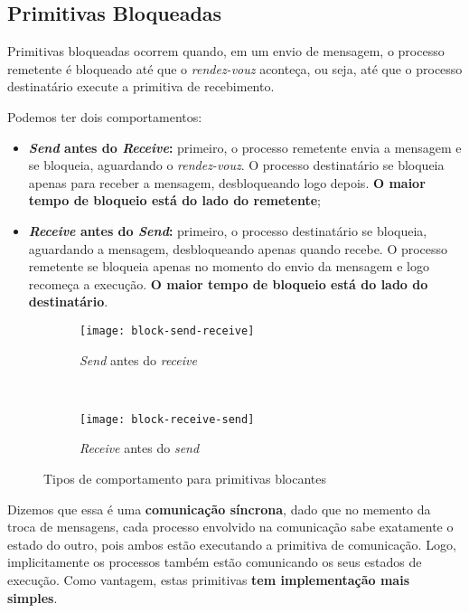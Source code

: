 \subsection{Primitivas Bloqueadas}
Primitivas bloqueadas ocorrem quando, em um envio de mensagem, o processo remetente é bloqueado até que o \textit{rendez-vouz} aconteça, ou seja, até que o processo destinatário execute a primitiva de recebimento.

Podemos ter dois comportamentos:
\begin{itemize}
  \item \textbf{\textit{Send} antes do \textit{Receive}:} primeiro, o processo remetente envia a mensagem e se bloqueia, aguardando o \textit{rendez-vouz}. O processo destinatário se bloqueia apenas para receber a mensagem, desbloqueando logo depois. \textbf{O maior tempo de bloqueio está do lado do remetente};

  \item \textbf{\textit{Receive} antes do \textit{Send}:} primeiro, o processo destinatário se bloqueia, aguardando a mensagem, desbloqueando apenas quando recebe. O processo remetente se bloqueia apenas no momento do envio da mensagem e logo recomeça a execução. \textbf{O maior tempo de bloqueio está do lado do destinatário}.
\end{itemize}

\begin{figure*}[ht]
  \begin{subfigure}[t]{0.5\textwidth}
    \centering
    \texttt{[image: block-send-receive]}
    \caption{\textit{Send} antes do \textit{receive}}
    \label{subfig:block-send-receive}
  \end{subfigure}
  ~
  \begin{subfigure}[t]{0.5\textwidth}
    \centering
    \texttt{[image: block-receive-send]}
    \caption{\textit{Receive} antes do \textit{send}}
    \label{subfig:block-receive-send}
  \end{subfigure}

  \caption{Tipos de comportamento para primitivas blocantes}
  \label{fig:blocking-types}
\end{figure*}

Dizemos que essa é uma \textbf{comunicação síncrona}, dado que no memento da troca de mensagens, cada processo envolvido na comunicação sabe exatamente o estado do outro, pois ambos estão executando a primitiva de comunicação. Logo, implicitamente os processos também estão comunicando os seus estados de execução. Como vantagem, estas primitivas \textbf{tem implementação mais simples}.

